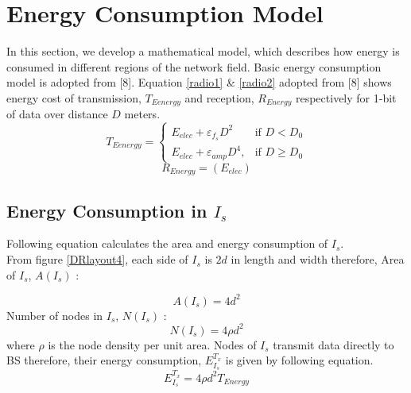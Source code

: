 \documentclass[3p,times,procedia]{elsarticle}
\begin{document}
\section{Energy Consumption Model}
In this section, we develop a mathematical model, which describes how energy is consumed in different regions of the network field. Basic energy consumption model is adopted from [8]. Equation \ref{radio1} \& \ref{radio2} adopted from [8] shows energy cost of transmission, $T_{Eenergy}$ and reception, $R_{Energy}$ respectively for 1-bit of data over distance $D$ meters.
\begin{equation}\label{radio1}
  T_{Eenergy} = \begin{cases} E_{elec} + \varepsilon _{f_{s}} D^{2} & \mbox{if } D < D_{0} \\ E_{elec} + \varepsilon _{amp} D^{4}, & \mbox{if } D \geq D_{0} \end{cases}
\end{equation}
\begin{equation}\label{radio2}
  R_{Energy} = (E_{elec} )
\end{equation}
\subsection{Energy Consumption in $I_s$}
Following equation calculates the area and energy consumption of $I_{s}$.
\\From figure \ref{DRlayout4}, each side of $I_{s}$ is $2d$ in length and width therefore, Area of $I_{s}$, $A(I_{s})$ :

\begin{equation}
 A(I_{s}) = 4d^{2}
\end{equation}
 Number of nodes in $I_{s}$, $N(I_{s})$ :
\begin{equation}
  N(I_{s}) = 4\rho d^{2}
\end{equation}
where $\rho$ is the node density per unit area.
  Nodes of $I_{s}$ transmit data directly to BS therefore, their energy consumption, $E^{T_{x}}_{I_{s}}$ is given by following equation.
\begin{equation}
  E^{T_{x}}_{I_{s}} = 4\rho d^{2} T_{Energy}
\end{equation}
\end{document}
